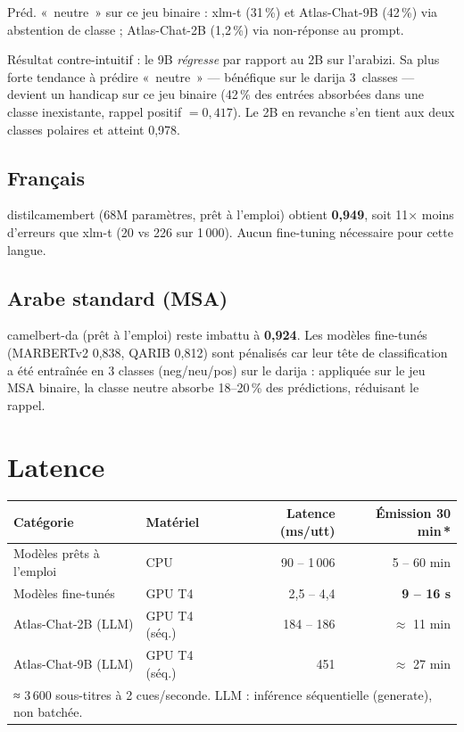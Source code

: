 \documentclass[11pt, a4paper]{article}
\begin{document}
\vspace{2pt}
{\small * Préd. «~neutre~» sur ce jeu binaire : xlm-t (31\,\%) et Atlas-Chat-9B (42\,\%) via abstention de classe ;
Atlas-Chat-2B (1{,}2\,\%) via non-réponse au prompt.}

\vspace{2pt}
Résultat contre-intuitif : le 9B \emph{régresse} par rapport au 2B sur l'arabizi.
Sa plus forte tendance à prédire «~neutre~» — bénéfique sur le darija 3~classes — devient
un handicap sur ce jeu binaire (42\,\% des entrées absorbées dans une classe inexistante,
rappel positif $= 0{,}417$). Le 2B en revanche s'en tient aux deux classes polaires et atteint 0{,}978.

\subsection{Français}

distilcamembert (68M paramètres, prêt à l'emploi) obtient \textbf{0{,}949},
soit 11× moins d'erreurs que xlm-t (20 vs 226 sur 1\,000). Aucun fine-tuning
nécessaire pour cette langue.

\subsection{Arabe standard (MSA)}

camelbert-da (prêt à l'emploi) reste imbattu à \textbf{0{,}924}.
Les modèles fine-tunés (MARBERTv2 0{,}838, QARIB 0{,}812) sont pénalisés
car leur tête de classification a été entraînée en 3 classes (neg/neu/pos) sur
le darija : appliquée sur le jeu MSA binaire, la classe neutre absorbe
18--20\,\% des prédictions, réduisant le rappel.

\section{Latence}

\begin{center}
\begin{tabular}{llrr}
\toprule
\textbf{Catégorie} & \textbf{Matériel} & \textbf{Latence (ms/utt)} & \textbf{Émission 30 min\,*} \\
\midrule
Modèles prêts à l'emploi & CPU & 90 -- 1\,006 & 5 -- 60 min \\
Modèles fine-tunés       & GPU T4 & 2{,}5 -- 4{,}4 & \textbf{9 -- 16 s} \\
\rowcolor{llmblue}
Atlas-Chat-2B (LLM)      & GPU T4 (séq.) & 184 -- 186 & $\approx$ 11 min \\
\rowcolor{llmblue}
Atlas-Chat-9B (LLM)      & GPU T4 (séq.) & 451 & $\approx$ 27 min \\
\bottomrule
\multicolumn{4}{l}{\small * ≈ 3\,600 sous-titres à 2 cues/seconde. LLM : inférence séquentielle (generate), non batchée.}
\end{tabular}
\end{center}
\end{document}
